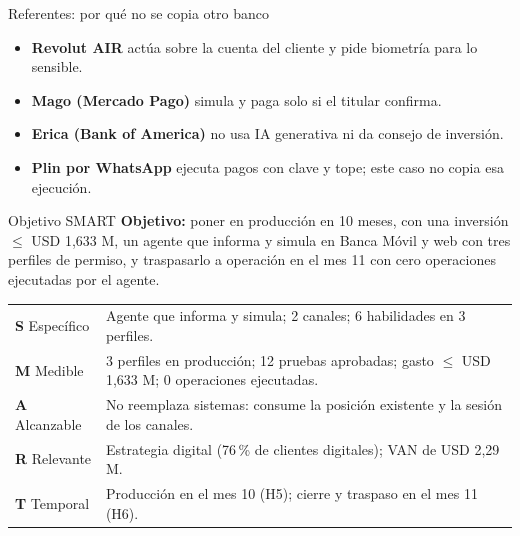 \documentclass[aspectratio=169,11pt]{beamer}
\begin{document}
\begin{frame}{Referentes: por qué no se copia otro banco}
\vspace{0.05cm}
\begin{itemize}
\setlength{\itemsep}{0.3em}
  \item \textbf{Revolut AIR} actúa sobre la cuenta del cliente y pide biometría para lo sensible.
  \item \textbf{Mago (Mercado Pago)} simula y paga solo si el titular confirma.
  \item \textbf{Erica (Bank of America)} no usa IA generativa ni da consejo de inversión.
  \item \textbf{Plin por WhatsApp} ejecuta pagos con clave y tope; este caso no copia esa ejecución.
\end{itemize}
\vspace{0.3cm}
\end{frame}

\begin{frame}{Objetivo SMART}
\vspace{0.05cm}
{\small\textbf{Objetivo:} poner en producción en 10 meses, con una inversión $\leq$ USD 1,633 M, un agente que informa y simula en Banca Móvil y web con tres perfiles de permiso, y traspasarlo a operación en el mes 11 con cero operaciones ejecutadas por el agente.}
\vspace{0.25cm}
\begin{center}
\footnotesize
\begin{tabular}{p{2.3cm}p{10.6cm}}
\toprule
\textbf{S} Específico & Agente que informa y simula; 2 canales; 6 habilidades en 3 perfiles. \\
\textbf{M} Medible & 3 perfiles en producción; 12 pruebas aprobadas; gasto $\leq$ USD 1,633 M; 0 operaciones ejecutadas. \\
\textbf{A} Alcanzable & No reemplaza sistemas: consume la posición existente y la sesión de los canales. \\
\textbf{R} Relevante & Estrategia digital (76\,\% de clientes digitales); VAN de USD 2,29 M. \\
\textbf{T} Temporal & Producción en el mes 10 (H5); cierre y traspaso en el mes 11 (H6). \\
\bottomrule
\end{tabular}
\end{center}
\end{frame}
\end{document}
